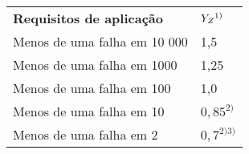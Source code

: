 \begin{table}
\centering
{}
\begin{tabular}{ll}
\textbf{Requisitos de aplicação}      & \textbf{$Y_Z \\ ^{1)}$ }   \\
Menos de uma falha em 10 000 & 1,5       \\
Menos de uma falha em 1000   & 1,25      \\
Menos de uma falha em 100    & 1,0       \\
Menos de uma falha em 10     & $0,85 ^{2)}$   \\
Menos de uma falha em 2      & $0,7^{2) 3)}$
\end{tabular}
\end{table}